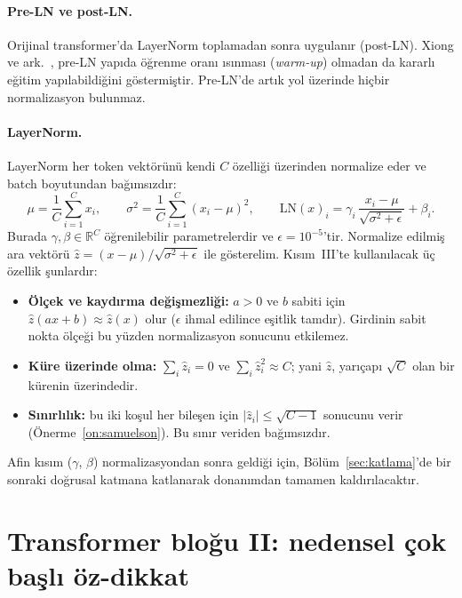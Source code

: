 \paragraph{Pre-LN ve post-LN.} Orijinal transformer'da LayerNorm toplamadan sonra uygulanır (post-LN). Xiong ve ark.\ \cite{xiong20}, pre-LN yapıda öğrenme oranı ısınması (\emph{warm-up}) olmadan da kararlı eğitim yapılabildiğini göstermiştir. Pre-LN'de artık yol üzerinde hiçbir normalizasyon bulunmaz.

\paragraph{LayerNorm.} LayerNorm \cite{ba16} her token vektörünü kendi $C$ özelliği üzerinden normalize eder ve batch boyutundan bağımsızdır:
\begin{equation}
  \mu = \frac{1}{C}\sum_{i=1}^{C} x_i, \qquad
  \sigma^2 = \frac{1}{C}\sum_{i=1}^{C} (x_i - \mu)^2, \qquad
  \mathrm{LN}(x)_i = \gamma_i\, \frac{x_i - \mu}{\sqrt{\sigma^2 + \epsilon}} + \beta_i .
\end{equation}
Burada $\gamma, \beta \in \mathbb{R}^C$ öğrenilebilir parametrelerdir ve $\epsilon = 10^{-5}$'tir. Normalize edilmiş ara vektörü $\hat z = (x-\mu)/\sqrt{\sigma^2+\epsilon}$ ile gösterelim. Kısım~III'te kullanılacak üç özellik şunlardır:
\begin{itemize}
  \item \textbf{Ölçek ve kaydırma değişmezliği:} $a>0$ ve $b$ sabiti için $\hat z(a x + b) \approx \hat z(x)$ olur ($\epsilon$ ihmal edilince eşitlik tamdır). Girdinin sabit nokta ölçeği bu yüzden normalizasyon sonucunu etkilemez.
  \item \textbf{Küre üzerinde olma:} $\sum_i \hat z_i = 0$ ve $\sum_i \hat z_i^2 \approx C$; yani $\hat z$, yarıçapı $\sqrt{C}$ olan bir kürenin üzerindedir.
  \item \textbf{Sınırlılık:} bu iki koşul her bileşen için $|\hat z_i| \le \sqrt{C-1}$ sonucunu verir (Önerme~\ref{on:samuelson}). Bu sınır veriden bağımsızdır.
\end{itemize}
Afin kısım ($\gamma$, $\beta$) normalizasyondan sonra geldiği için, Bölüm~\ref{sec:katlama}'de bir sonraki doğrusal katmana katlanarak donanımdan tamamen kaldırılacaktır.

\section{Transformer bloğu II: nedensel çok başlı öz-dikkat}

